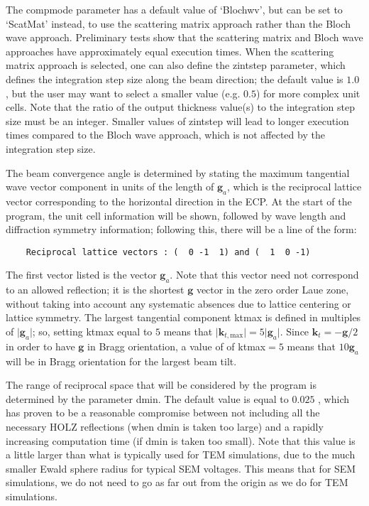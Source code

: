 \documentclass[DIV=calc, paper=letter, fontsize=11pt]{scrartcl}	 %
\begin{document}
The \textsf{compmode} parameter has a default value of \textsf{`Blochwv'}, but can be set to \textsf{`ScatMat'} instead, to use the 
scattering matrix approach rather than the Bloch wave approach.  Preliminary tests show that the scattering matrix and Bloch wave approaches 
have approximately equal execution times.  When the scattering matrix approach is selected, one can also define the \textsf{zintstep}
parameter, which defines the integration step size along the beam direction; the default value is $1.0$ \nano\meter, but the user 
may want to select a smaller value (e.g. $0.5$) for more complex unit cells.  Note that the ratio of the output thickness value(s)
to the integration step size must be an integer.  Smaller values of \textsf{zintstep} will lead to longer execution times compared to the
Bloch wave approach, which is not affected by the integration step size.

The beam convergence angle is determined by stating the maximum tangential wave vector component in units of the length of $\mathbf{g}_a$,
which is the reciprocal lattice vector corresponding to the horizontal direction in the ECP.  At the start of the program, the unit
cell information will be shown, followed by wave length and diffraction symmetry information; following this, there will be a line of 
the form:
\begin{verbatim}
	Reciprocal lattice vectors : (  0 -1  1) and (  1  0 -1)
\end{verbatim}
The first vector listed is the vector $\mathbf{g}_a$. Note that this vector need not correspond to an allowed reflection; it is
the shortest $\mathbf{g}$ vector in the zero order Laue zone, without taking into account any systematic absences due to lattice 
centering or lattice symmetry.  The largest tangential component \textsf{ktmax} is defined in multiples of $\vert\mathbf{g}_a\vert$;
so, setting \textsf{ktmax} equal to $5$ means that $\vert\mathbf{k}_{t,\text{max}}\vert=5\vert\mathbf{g}_a\vert$.  Since $\mathbf{k}_t=-\mathbf{g}/2$
in order to have $\mathbf{g}$ in Bragg orientation, a value of of \textsf{ktmax}$=5$ means that $10\mathbf{g}_a$ will be in Bragg orientation
for the largest beam tilt.

The range of reciprocal space that will be considered by the program is determined by the parameter \textsf{dmin}.  The default value is
equal to $0.025$ \nano\meter, which has proven to be a reasonable compromise between not including all the necessary HOLZ reflections (when
\textsf{dmin} is taken too large) and a rapidly increasing computation time (if \textsf{dmin} is taken too small).  Note that this value is
a little larger than what is typically used for TEM simulations, due to the much smaller Ewald sphere radius for typical SEM voltages.  This means
that for SEM simulations, we do not need to go as far out from the origin as we do for TEM simulations.
\end{document}
